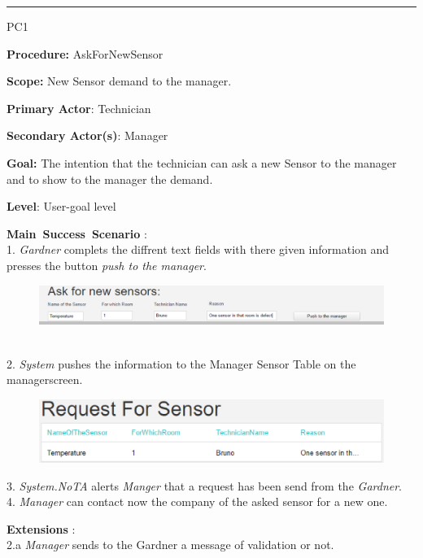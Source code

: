 \vspace{0.5cm}
\hrule
\hfill \break
\begin{lyxlist}{PC1}
\small{
\item [\textbf{Procedure:}] AskForNewSensor
\item [\textbf{Scope:}] New Sensor demand to the manager.
\item [\textbf{Primary Actor}:] Technician
\item [\textbf{Secondary Actor(s)}:] Manager
\item [\textbf{Goal:}] The intention that the technician can ask a new Sensor to
the manager and to show to the manager the demand.
\item [\textbf{Level}:] User-goal level
\item [\textbf{Main~Success~Scenario}]:\\
1. \emph{Gardner} complets the diffrent text fields with there given
information and presses the button \emph{push to the manager}. 
\begin{figure}
\includegraphics[width=1\textwidth]{images/AskForSensor.eps}
\end{figure} \\
2. \emph{System} pushes the information to the Manager Sensor Table on the
 managerscreen. \\
 \begin{figure}
\includegraphics[width=1\textwidth]{images/requestsensor.eps}
\end{figure}
3. \emph{System.NoTA} alerts \emph{Manger} that a request has been send from
the \emph{Gardner}.\\
4. \emph{Manager} can contact now the company of the asked sensor for a new
one.\\
\item [\textbf{Extensions}]:\\
2.a  \emph{Manager} sends to the Gardner a message of
validation or not.\\
}
\end{lyxlist}

